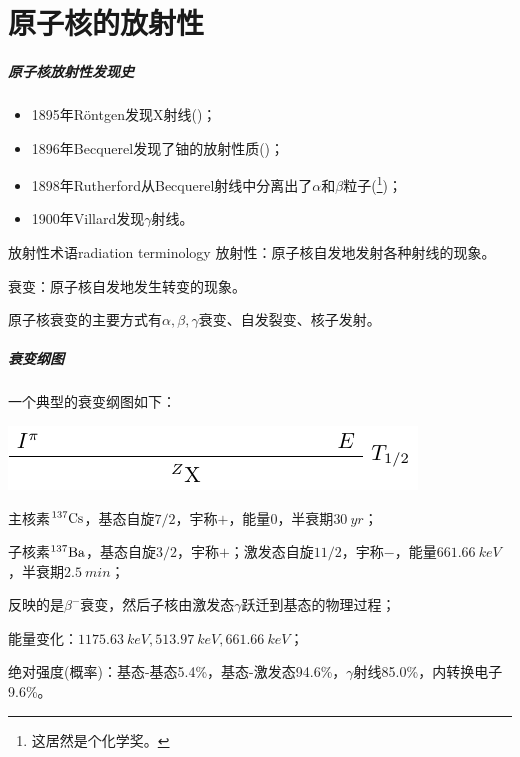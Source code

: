 \chapter{原子核的放射性}

\paragraph{原子核放射性发现史}
\begin{itemize}
	\item 1895年Röntgen发现X射线()；
	\item 1896年Becquerel发现了铀的放射性质()；
	\item 1898年Rutherford从Becquerel射线中分离出了$\alpha$和$\beta$粒子(\footnote{这居然是个化学奖。})；
	\item 1900年Villard发现$\gamma$射线。
\end{itemize}

\begin{definition}{放射性术语}{radiation terminology}
	放射性：原子核自发地发射各种射线的现象。


	衰变：原子核自发地发生转变的现象。
\end{definition}
原子核衰变的主要方式有$\alpha,\beta,\gamma$衰变、自发裂变、核子发射。

\paragraph{衰变纲图}一个典型的衰变纲图如下：
\begin{center}
		\includegraphics[page=3]{figures/tikz/layouts.pdf}
\end{center}
\begin{compactenum}
	\item 主核素${^{137}\mathrm{Cs}}$，基态自旋$7/2$，宇称$+$，能量$0$，半衰期$\SI{30}{yr}$；
	\item 子核素${^{137}\mathrm{Ba}}$，基态自旋$3/2$，宇称$+$；激发态自旋$11/2$，宇称$-$，能量$\SI{661.66}{keV}$，半衰期$\SI{2.5}{min}$；
	\item 反映的是$\beta^-$衰变，然后子核由激发态$\gamma$跃迁到基态的物理过程；
	\item 能量变化：$\SI{1175.63}{keV},\SI{513.97}{keV},\SI{661.66}{keV}$；
	\item 绝对强度(概率)：基态-基态5.4\%，基态-激发态94.6\%，$\gamma$射线85.0\%，内转换电子9.6\%。
\end{compactenum} 

